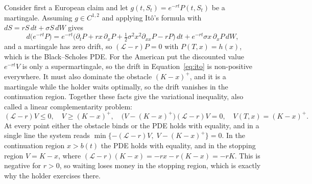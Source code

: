 Consider first a European claim and let $g(t,S_t)=e^{-rt}P(t,S_t)$ be a martingale.
Assuming $g\in C^{1,2}$ and applying It\^o's formula with $dS=rS\,dt+\sigma S\,dW$ gives
\begin{equation}\label{eq:ito}
 d\big(e^{-rt}P\big)=e^{-rt}\big(\partial_tP+rx\,\partial_xP+\tfrac12\sigma^2x^2\partial_{xx}P-rP\big)\,dt+e^{-rt}\sigma x\,\partial_xP\,dW,
\end{equation}
and a martingale has zero drift, so $(\mathcal L-r)P=0$ with $P(T,x)=h(x)$, which is the Black--Scholes PDE.
For the American put the discounted value $e^{-rt}V$ is only a supermartingale, so the drift in Equation~\eqref{eq:ito} is non-positive everywhere.
It must also dominate the obstacle $(K-x)^+$, and it is a martingale while the holder waits optimally, so the drift vanishes in the continuation region.
Together these facts give the variational inequality, also called a linear complementarity problem:
\begin{equation}\label{eq:VI}
 (\mathcal L-r)V\le0,\quad V\ge(K-x)^+,\quad \big(V-(K-x)^+\big)(\mathcal L-r)V=0,\quad V(T,x)=(K-x)^+ .
\end{equation}
At every point either the obstacle binds or the PDE holds with equality, and in a single line the system reads $\min\{-(\mathcal L-r)V,\;V-(K-x)^+\}=0$.
In the continuation region $x>b(t)$ the PDE holds with equality, and in the stopping region $V=K-x$, where $(\mathcal L-r)(K-x)=-rx-r(K-x)=-rK$.
This is negative for $r>0$, so waiting loses money in the stopping region, which is exactly why the holder exercises there.
